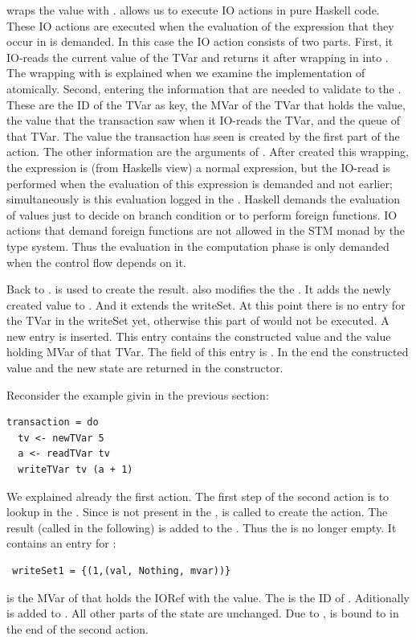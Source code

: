  wraps
the value with .  allows us to execute IO actions in pure
Haskell code. These IO actions are executed when the evaluation of the expression that they occur in 
is demanded. In this case the IO action consists of two parts. First, it IO-reads the 
current value of the TVar and returns it after wrapping in into . The wrapping with 
 is explained when we examine the implementation of atomically. Second, entering the 
information that are needed to validate to the . These are the ID of the TVar as 
key, the MVar of the TVar that holds the value, the value that the transaction saw when it IO-reads
the TVar, and the queue of that TVar. The value the transaction has seen is created by the first 
part of the  action. The other information are the arguments of . After 
created this wrapping, the expression is (from Haskells view) a normal expression, but the IO-read is
performed when the evaluation of this expression is demanded and not earlier; simultaneously is this 
evaluation logged in the . Haskell demands the evaluation of values just to decide on
branch condition or to perform foreign functions. IO actions that demand foreign functions are not allowed in the STM monad by the type
system. Thus the evaluation in the computation phase is only demanded when the control flow depends 
on it. 

Back to .  is used to create the result.  also modifies the 
the . It adds the newly created value to . And it extends the writeSet.
At this point there is no entry for the TVar in the writeSet yet, otherwise this part of 
would not be executed. A new entry is inserted. This entry contains the constructed value and 
the value holding MVar of that TVar. The  field of this entry is .
In the end the constructed value and the new state are returned in the  constructor.

Reconsider the example givin in the previous section:
\begin{lstlisting}
transaction = do 
  tv <- newTVar 5
  a <- readTVar tv
  writeTVar tv (a + 1)
\end{lstlisting}
We explained already the first action. The first step of the second action is to lookup 
in the . Since  is not present in the ,  is
called to create the  action. The result (called  in the 
following) is added to the . Thus the  is no longer empty. It contains 
an entry for :
\begin{lstlisting}
 writeSet1 = {(1,(val, Nothing, mvar))}
\end{lstlisting}
 is the MVar of  that holds the IORef with the value. The  is the
ID of . Aditionally is  
added to . All other parts of the state are unchanged. Due to \code{<-},  is 
bound to  in the end of the second action. 


